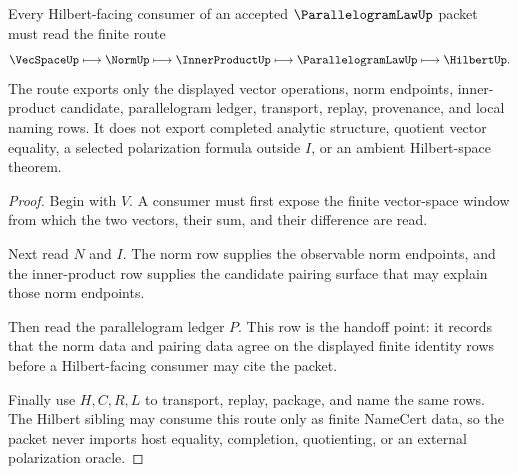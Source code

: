 \begin{theorem}
\label{thm:parallelogram-law-norm-inner-product-handoff}
Every Hilbert-facing consumer of an accepted $\ParallelogramLawUp$ packet must read the finite route
$$
\VecSpaceUp\longmapsto\NormUp\longmapsto\InnerProductUp\longmapsto\ParallelogramLawUp\longmapsto\HilbertUp .
$$
The route exports only the displayed vector operations, norm endpoints, inner-product candidate, parallelogram ledger, transport, replay, provenance, and local naming rows. It does not export completed analytic structure, quotient vector equality, a selected polarization formula outside $I$, or an ambient Hilbert-space theorem.
\end{theorem}
\begin{proof}
Begin with $V$. A consumer must first expose the finite vector-space window from which the two vectors, their sum, and their difference are read.

Next read $N$ and $I$. The norm row supplies the observable norm endpoints, and the inner-product row supplies the candidate pairing surface that may explain those norm endpoints.

Then read the parallelogram ledger $P$. This row is the handoff point: it records that the norm data and pairing data agree on the displayed finite identity rows before a Hilbert-facing consumer may cite the packet.

Finally use $H,C,R,L$ to transport, replay, package, and name the same rows. The Hilbert sibling may consume this route only as finite NameCert data, so the packet never imports host equality, completion, quotienting, or an external polarization oracle.
\end{proof}




